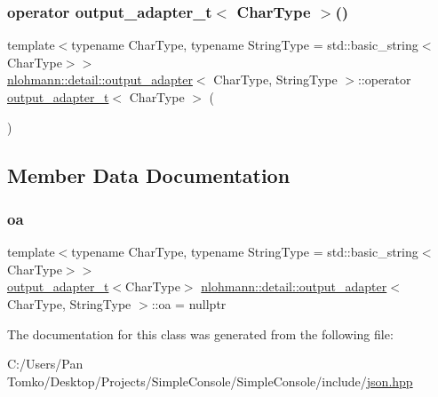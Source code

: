 \subsubsection{\texorpdfstring{operator output\_adapter\_t$<$ CharType $>$()}{operator output\_adapter\_t< CharType >()}}
{\footnotesize\ttfamily template$<$typename Char\+Type, typename String\+Type = std\+::basic\+\_\+string$<$\+Char\+Type$>$$>$ \\
\mbox{\hyperlink{classnlohmann_1_1detail_1_1output__adapter}{nlohmann\+::detail\+::output\+\_\+adapter}}$<$ Char\+Type, String\+Type $>$\+::operator \mbox{\hyperlink{namespacenlohmann_1_1detail_a9b680ddfb58f27eb53a67229447fc556}{output\+\_\+adapter\+\_\+t}}$<$ Char\+Type $>$ (\begin{DoxyParamCaption}{ }\end{DoxyParamCaption})\hspace{0.3cm}{\ttfamily [inline]}}



\subsection{Member Data Documentation}
\mbox{\label{classnlohmann_1_1detail_1_1output__adapter_a323c18d74d6680faafec6dc3ace825e2}} 
\subsubsection{\texorpdfstring{oa}{oa}}
{\footnotesize\ttfamily template$<$typename Char\+Type, typename String\+Type = std\+::basic\+\_\+string$<$\+Char\+Type$>$$>$ \\
\mbox{\hyperlink{namespacenlohmann_1_1detail_a9b680ddfb58f27eb53a67229447fc556}{output\+\_\+adapter\+\_\+t}}$<$Char\+Type$>$ \mbox{\hyperlink{classnlohmann_1_1detail_1_1output__adapter}{nlohmann\+::detail\+::output\+\_\+adapter}}$<$ Char\+Type, String\+Type $>$\+::oa = nullptr\hspace{0.3cm}{\ttfamily [private]}}



The documentation for this class was generated from the following file\+:\begin{DoxyCompactItemize}
\item 
C\+:/\+Users/\+Pan Tomko/\+Desktop/\+Projects/\+Simple\+Console/\+Simple\+Console/include/\mbox{\hyperlink{json_8hpp}{json.\+hpp}}\end{DoxyCompactItemize}
